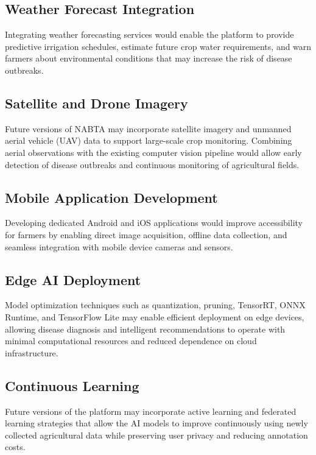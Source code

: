 \subsection{Weather Forecast Integration}
\label{subsec:fw_weather}

Integrating weather forecasting services would enable the platform to provide predictive irrigation schedules, estimate future crop water requirements, and warn farmers about environmental conditions that may increase the risk of disease outbreaks.

\subsection{Satellite and Drone Imagery}
\label{subsec:fw_satellite}

Future versions of NABTA may incorporate satellite imagery and unmanned aerial vehicle (UAV) data to support large-scale crop monitoring. Combining aerial observations with the existing computer vision pipeline would allow early detection of disease outbreaks and continuous monitoring of agricultural fields.

\subsection{Mobile Application Development}
\label{subsec:fw_mobile}

Developing dedicated Android and iOS applications would improve accessibility for farmers by enabling direct image acquisition, offline data collection, and seamless integration with mobile device cameras and sensors.

\subsection{Edge AI Deployment}
\label{subsec:fw_edge}

Model optimization techniques such as quantization, pruning, TensorRT, ONNX Runtime, and TensorFlow Lite may enable efficient deployment on edge devices, allowing disease diagnosis and intelligent recommendations to operate with minimal computational resources and reduced dependence on cloud infrastructure.

\subsection{Continuous Learning}
\label{subsec:fw_learning}

Future versions of the platform may incorporate active learning and federated learning strategies that allow the AI models to improve continuously using newly collected agricultural data while preserving user privacy and reducing annotation costs.


